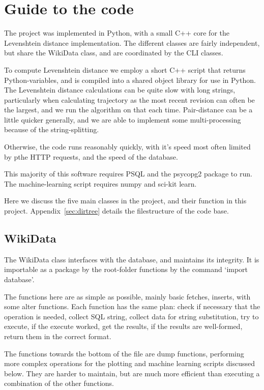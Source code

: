 \section{Guide to the code}

The project was implemented in Python, with a small C++ core for the
Levenshtein distance implementation. The different classes are fairly
independent, but share the WikiData class, and are coordinated by the
CLI classes. 

To compute Levenshtein distance we employ a short C++ script that
returns Python-variables, and is compiled into a shared object library
for use in Python. The Levenshtein distance calculations can be quite
slow with long strings, particularly when calculating trajectory as the
most recent revision can often be the largest, and we run the
algorithm on that each time. Pair-distance can be a little quicker
generally, and we are able to implement some multi-processing because
of the string-splitting.

Otherwise, the code runs reasonably quickly, with it's speed most
often limited by pthe HTTP requests, and the speed of the
database.

This majority of this software requires PSQL and the psycopg2 package
to run. The machine-learning script requires numpy and sci-kit learn.

Here we discuss the five main classes in the project, and their
function in this project. Appendix~\ref{sec:dirtree} details the
filestructure of the code base.

\subsection*{WikiData}
The WikiData class interfaces with the database, and maintains its
integrity. It is importable as a package by the root-folder functions
by the command `import database'.

The functions here are as simple as possible, mainly basic fetches,
inserts, with some alter functions. Each function has the same plan:
check if necessary that the operation is needed, collect SQL string,
collect data for string substitution, try to execute, if the execute
worked, get the results, if the results are well-formed, return them in the
correct format.

The functions towards the bottom of the file are dump functions,
performing more complex operations for the plotting and machine
learning scripts discussed below. They are harder to maintain, but are
much more efficient than executing a combination of the other
functions.

